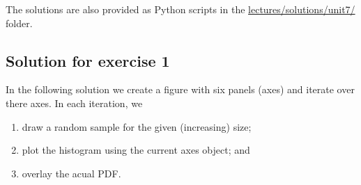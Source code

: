 \documentclass[10pt]{scrartcl}
\providecommand{\tightlist}{%
      \setlength{\itemsep}{0pt}\setlength{\parskip}{0pt}}
\begin{document}
The solutions are also provided as Python scripts in the
\href{../lectures/solutions/unit7}{lectures/solutions/unit7/} folder.

    \hypertarget{solution-for-exercise-1}{%
\subsection{Solution for exercise 1}\label{solution-for-exercise-1}}

In the following solution we create a figure with six panels (axes) and
iterate over there axes. In each iteration, we

\begin{enumerate}
\def\labelenumi{\arabic{enumi}.}
\tightlist
\item
  draw a random sample for the given (increasing) size;
\item
  plot the histogram using the current axes object; and
\item
  overlay the acual PDF.
\end{enumerate}
\end{document}
